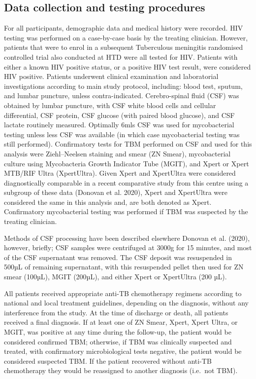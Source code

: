 \documentclass[
]{article}
\begin{document}
\hypertarget{data-collection-and-testing-procedures}{%
\subsection{Data collection and testing procedures}\label{data-collection-and-testing-procedures}}

For all participants, demographic data and medical history were recorded. HIV testing was performed on a case-by-case basis by the treating clinician. However, patients that were to enrol in a subsequent Tuberculous meningitis randomised controlled trial also conducted at HTD were all tested for HIV. Patients with either a known HIV positive status, or a positive HIV test result, were considered HIV positive. Patients underwent clinical examination and laboratorial investigations according to main study protocol, including: blood test, sputum, and lumbar puncture, unless contra-indicated. Cerebro-spinal fluid (CSF) was obtained by lumbar puncture, with CSF white blood cells and cellular differential, CSF protein, CSF glucose (with paired blood glucose), and CSF lactate routinely measured. Optimally 6mls CSF was used for mycobacterial testing unless less CSF was available (in which case mycobacterial testing was still performed). Confirmatory tests for TBM performed on CSF and used for this analysis were Ziehl--Neelsen staining and smear (ZN Smear), mycobacterial culture using Mycobacteria Growth Indicator Tube (MGIT), and Xpert or Xpert MTB/RIF Ultra (XpertUltra). Given Xpert and XpertUltra were considered diagnostically comparable in a recent comparative study from this centre using a subgroup of these data (Donovan et al. 2020), Xpert and XpertUltra were considered the same in this analysis and, are both denoted as Xpert. Confirmatory mycobacterial testing was performed if TBM was suspected by the treating clinician.

Methods of CSF processing have been described elsewhere Donovan et al. (2020), however, briefly; CSF samples were centrifuged at 3000g for 15 minutes, and most of the CSF supernatant was removed. The CSF deposit was resuspended in 500µL of remaining supernatant, with this resuspended pellet then used for ZN smear (100µL), MGIT (200µL), and either Xpert or XpertUltra (200 µL).

All patients received appropriate anti-TB chemotherapy regimens according to national and local treatment guidelines, depending on the diagnosis, without any interference from the study. At the time of discharge or death, all patients received a final diagnosis. If at least one of ZN Smear, Xpert, Xpert Ultra, or MGIT, was positive at any time during the follow-up, the patient would be considered confirmed TBM; otherwise, if TBM was clinically suspected and treated, with confirmatory microbiological tests negative, the patient would be considered suspected TBM. If the patient recovered without anti-TB chemotherapy they would be reassigned to another diagnosis (i.e.~not TBM).
\end{document}

